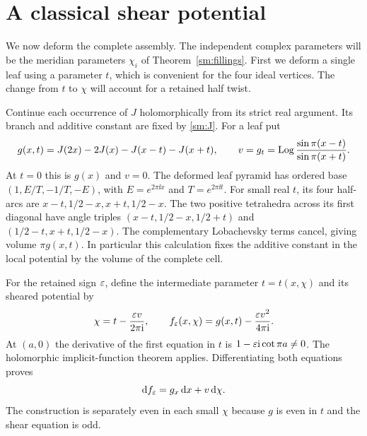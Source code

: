 \section{A classical shear potential}\label{sm:potential}

We now deform the complete assembly. The independent complex
parameters will be the meridian parameters $\chi_i$ of
Theorem~\ref{sm:fillings}. First we deform a single leaf using a
parameter $t$, which is convenient for the four ideal vertices.
The change from $t$ to $\chi$ will account for a retained half twist.

Continue each occurrence of $J$ holomorphically from its strict real
argument. Its branch and additive constant are fixed by
\eqref{sm:J}. For a leaf put
\begin{equation}\label{sm:mixed-g}
 g(x,t)=J(2x)-2J(x)-J(x-t)-J(x+t),\qquad
 v=g_t=\operatorname{Log}\frac{\sin\pi(x-t)}{\sin\pi(x+t)}.
\end{equation}
At $t=0$ this is $g(x)$ and $v=0$. The deformed leaf pyramid has
ordered base
$(1,E/T,-1/T,-E)$, with $E=e^{2\pi\ii x}$ and $T=e^{2\pi\ii t}$.
For small real $t$, its four half-arcs are
$x-t,1/2-x,x+t,1/2-x$. The two positive tetrahedra across its
first diagonal have angle triples
$(x-t,1/2-x,1/2+t)$ and $(1/2-t,x+t,1/2-x)$.
The complementary Lobachevsky terms cancel, giving volume
$\pi g(x,t)$. In particular this calculation fixes the additive
constant in the local potential by the volume of the complete cell.

For the retained sign $\varepsilon$, define the intermediate parameter
$t=t(x,\chi)$ and its sheared potential by
\begin{equation}\label{sm:shear}
 \chi=t-\frac{\varepsilon v}{2\pi\mathrm i},\qquad
 f_\varepsilon(x,\chi)=g(x,t)-\frac{\varepsilon v^2}{4\pi\mathrm i}.
\end{equation}
At $(a,0)$ the derivative of the first equation in $t$ is
$1-\varepsilon\mathrm i\cot\pi a\ne0$. The holomorphic implicit-function
theorem applies. Differentiating both equations proves
\begin{equation}\label{sm:local-differential}
                         \mathrm d f_\varepsilon=g_x\,\mathrm d x+v\,\mathrm d\chi.
\end{equation}
The construction is separately even in each small $\chi$ because
$g$ is even in $t$ and the shear equation is odd.

